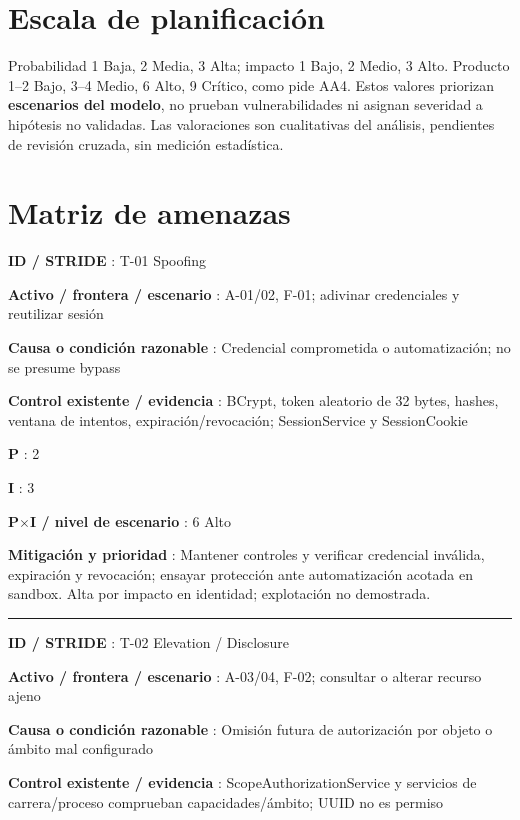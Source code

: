 \documentclass[12pt,a4paper]{report}
\begin{document}
\section{Escala de
planificación}\label{AA4-semana-4-anexo0-escala-de-planificaciuxf3n}

Probabilidad 1 Baja, 2 Media, 3 Alta; impacto 1 Bajo, 2 Medio, 3 Alto.
Producto 1--2 Bajo, 3--4 Medio, 6 Alto, 9 Crítico, como pide AA4. Estos
valores priorizan \textbf{escenarios del modelo}, no prueban
vulnerabilidades ni asignan severidad a hipótesis no validadas. Las
valoraciones son cualitativas del análisis, pendientes de revisión
cruzada, sin medición estadística.

\section{Matriz de
amenazas}\label{AA4-semana-4-anexo0-matriz-de-amenazas}

\textbf{ID / STRIDE }: T-01 Spoofing

\textbf{Activo / frontera / escenario }: A-01/02, F-01; adivinar
credenciales y reutilizar sesión

\textbf{Causa o condición razonable }: Credencial comprometida o
automatización; no se presume bypass

\textbf{Control existente / evidencia }: BCrypt, token aleatorio de 32
bytes, hashes, ventana de intentos, expiración/revocación;
SessionService y SessionCookie

\textbf{P }: 2

\textbf{I }: 3

\textbf{P\ensuremath{\times}I / nivel de escenario }: 6 Alto

\textbf{Mitigación y prioridad }: Mantener controles y verificar
credencial inválida, expiración y revocación; ensayar protección ante
automatización acotada en sandbox. Alta por impacto en identidad;
explotación no demostrada.

\medskip\hrule\medskip

\textbf{ID / STRIDE }: T-02 Elevation / Disclosure

\textbf{Activo / frontera / escenario }: A-03/04, F-02; consultar o
alterar recurso ajeno

\textbf{Causa o condición razonable }: Omisión futura de autorización
por objeto o ámbito mal configurado

\textbf{Control existente / evidencia }: ScopeAuthorizationService y
servicios de carrera/proceso comprueban capacidades/ámbito; UUID no es
permiso
\end{document}
